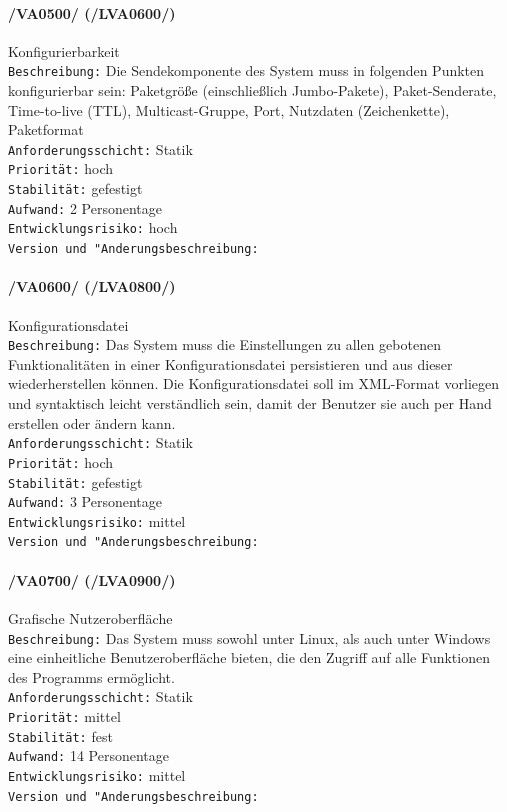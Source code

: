 \paragraph{/VA0500/ (/LVA0600/)} Konfigurierbarkeit\\
\texttt{Beschreibung:} Die Sendekomponente des System muss in folgenden
Punkten konfigurierbar sein: Paketgröße (einschließlich Jumbo-Pakete),
Paket-Senderate, Time-to-live (TTL), Multicast-Gruppe, Port, Nutzdaten
(Zeichenkette), Paketformat\\
\texttt{Anforderungsschicht:} Statik\\
\texttt{Priorität:} hoch\\
\texttt{Stabilität:} gefestigt\\
\texttt{Aufwand:} 2 Personentage\\
\texttt{Entwicklungsrisiko:} hoch\\
\texttt{Version und "Anderungsbeschreibung:}

\paragraph{/VA0600/ (/LVA0800/)} Konfigurationsdatei\\
\texttt{Beschreibung:} Das System muss die Einstellungen zu allen gebotenen
Funktionalitäten in einer Konfigurationsdatei persistieren und aus dieser
wiederherstellen können. Die Konfigurationsdatei soll im XML-Format vorliegen
und syntaktisch leicht verständlich sein, damit der Benutzer sie auch per Hand
erstellen oder ändern kann.\\
\texttt{Anforderungsschicht:} Statik\\
\texttt{Priorität:} hoch\\
\texttt{Stabilität:} gefestigt\\
\texttt{Aufwand:} 3 Personentage\\
\texttt{Entwicklungsrisiko:} mittel\\
\texttt{Version und "Anderungsbeschreibung:}

\paragraph{/VA0700/ (/LVA0900/)} Grafische Nutzeroberfläche\\
\texttt{Beschreibung:} Das System muss sowohl unter Linux, als auch unter
Windows eine einheitliche Benutzeroberfläche bieten, die den Zugriff auf alle Funktionen
des Programms ermöglicht.\\
\texttt{Anforderungsschicht:} Statik\\
\texttt{Priorität:} mittel\\
\texttt{Stabilität:} fest\\
\texttt{Aufwand:} 14 Personentage\\
\texttt{Entwicklungsrisiko:} mittel\\
\texttt{Version und "Anderungsbeschreibung:}

